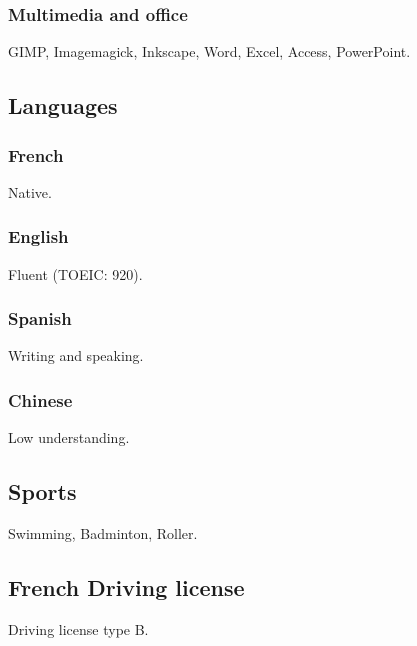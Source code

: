 \documentclass{article}
\begin{document}
\begin{multicols}{2}
                \subsubsection{Multimedia and office}
                    GIMP, Imagemagick, Inkscape, Word, Excel, Access, PowerPoint.
            \subsection{Languages}
                \subsubsection{French}
                    Native.
                \subsubsection{English}
                    Fluent (TOEIC: 920).
                \subsubsection{Spanish}
                    Writing and speaking.
                \subsubsection{Chinese}
                    Low understanding.
                \subsection{Sports}
                    Swimming, Badminton, Roller.
                \subsection{French Driving license}
                	Driving license type B.
    \end{multicols}
\end{document}
